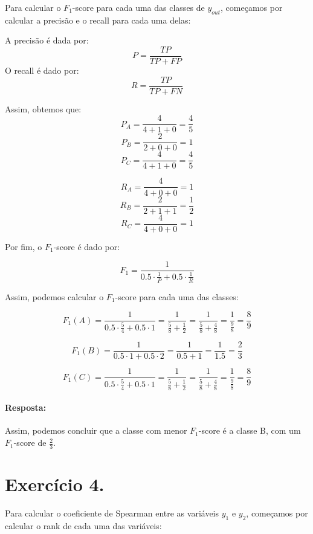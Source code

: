 \documentclass{article}
\begin{document}
Para calcular o $F_1$-score para cada uma das classes de $y_{out}$, começamos por calcular a precisão e o recall para cada uma delas:

A precisão é dada por:
\[ P = \frac{TP}{TP + FP} \]
O recall é dado por:
\[ R = \frac{TP}{TP + FN} \]

Assim, obtemos que:
\[ P_A = \frac{4}{4 + 1 + 0} = \frac{4}{5} \]
\[ P_B = \frac{2}{2 + 0 + 0} = 1 \]
\[ P_C = \frac{4}{4 + 1 + 0} = \frac{4}{5} \]

\[ R_A = \frac{4}{4 + 0 + 0} = 1 \]
\[ R_B = \frac{2}{2 + 1 + 1} = \frac{1}{2} \]
\[ R_C = \frac{4}{4 + 0 + 0} = 1 \]

Por fim, o $F_1$-score é dado por:

\[ F_1 = \frac{1}{0.5\cdot \frac{1}{P} + 0.5\cdot \frac{1}{R}} \]

Assim, podemos calcular o $F_1$-score para cada uma das classes:

\[ F_1(A) = \frac{1}{0.5\cdot \frac{5}{4} + 0.5\cdot 1} = \frac{1}{\frac{5}{8} + \frac{1}{2}} = \frac{1}{\frac{5}{8} + \frac{4}{8}} = \frac{1}{\frac{9}{8}} = \frac{8}{9} \]

\[ F_1(B) = \frac{1}{0.5\cdot 1 + 0.5\cdot 2} = \frac{1}{0.5 + 1} = \frac{1}{1.5} = \frac{2}{3} \]

\[ F_1(C) = \frac{1}{0.5\cdot \frac{5}{4} + 0.5\cdot 1} = \frac{1}{\frac{5}{8} + \frac{1}{2}} = \frac{1}{\frac{5}{8} + \frac{4}{8}} = \frac{1}{\frac{9}{8}} = \frac{8}{9} \]

\paragraph{Resposta: }
Assim, podemos concluir que a classe com menor $F_1$-score é a classe B, com um $F_1$-score de $\frac{2}{3}$.

\newpage

\section{Exercício 4.}

Para calcular o coeficiente de Spearman entre as variáveis $y_1$ e $y_2$, começamos por calcular o rank de cada uma das variáveis:
\end{document}
